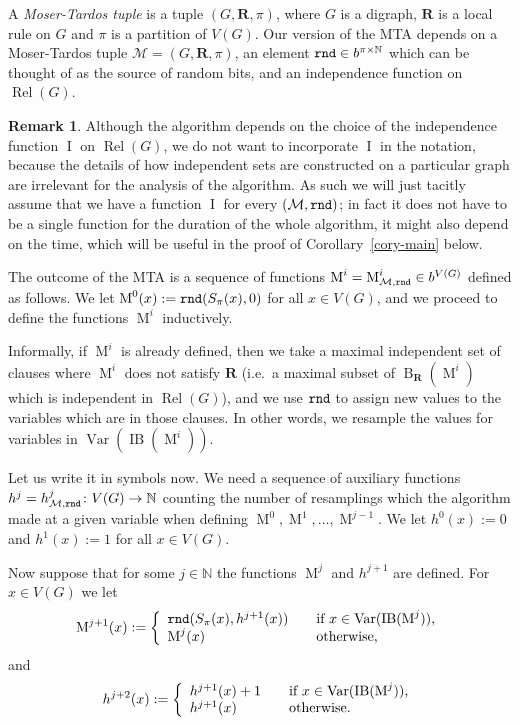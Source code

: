 \documentclass[12pt,a4paper]{article}
\numberwithin{equation}{section}
\theoremstyle{definition}
\newtheorem{remark}[equation]{Remark}
\newenvironment{myrem}{%
        \begin{mdframed}[%
            linewidth=4pt, 
            topline=false, 
            bottomline=false, 
            rightline=false,%
            leftmargin=0pt, 
            innerleftmargin=0.4em, 
            rightmargin=0pt, 
            innerrightmargin=0pt, 
            innertopmargin=0pt ,%
            innerbottommargin=0pt, 
            splittopskip=\topskip, 
            splitbottomskip=0.3\topskip, %
            ]%
        \begin{remark}
    }{%
        \end{remark}
        \end{mdframed}
    }
\newcommand\NN{\mathbb N}
\renewcommand{\cal}[1]{{\mathcal #1}}
\newcommand{\bits}{b}
\newcommand\MT{\operatorname{M}}
\newcommand\I{\operatorname{I}}
\newcommand\B{\operatorname{B}}
\newcommand\IB{\operatorname{IB}}
\newcommand\Rel{\operatorname{Rel}}
\newcommand\Var{\operatorname{Var}}
\begin{document}
    
    A \emph{Moser-Tardos tuple} is a tuple $(G,\mathbf R, \pi)$, where $G$ is a digraph, $\mathbf R$ is a local rule on $G$ and $\pi$ is a partition of $V(G)$. Our version of the MTA depends on a Moser-Tardos tuple $\cal M = (G, \mathbf R, \pi)$, an element $\rnd\in \bits^{\pi\times \NN}$ which can be thought of as the source of random bits, and an independence function on $\Rel(G)$. 
    
    \begin{myrem} Although the algorithm depends on the choice of the independence function $\I$ on $\Rel(G)$, we do not want to incorporate $\I$ in the notation, because the details of how independent sets are constructed on a particular graph are irrelevant for the analysis of the algorithm. As such we will just tacitly assume that we have a function $\I$ for every $(\cal M,\rnd)$; in fact it does not have to be a single function for the duration of the whole algorithm, it might also depend on the time, which will be useful in the proof of Corollary~\ref{cory-main} below.
    \end{myrem}
    
    The outcome of the MTA is a sequence of functions $\MT^i = \MT^i_{\cal M, \rnd}\in b^{V(G)}$ defined as follows.
    We let  $\MT^0(x) := \rnd(S_\pi(x),0)$ for all $x\in V(G)$, and we proceed to define the functions $\MT^i$ inductively. 
    
    Informally, if $\MT^i$ is already defined, then we take a maximal independent set of clauses where $\MT^i$ does not satisfy $\mathbf R$ (i.e.~a maximal subset of $\B_{\mathbf R}(\MT^i)$ which is independent in $\Rel(G)$), and we use $\normalfont{\texttt{rnd}}$ to assign new values to the variables which are in those clauses. In other words, we resample the values for variables in $\Var(\IB(\MT^i))$.
    
    Let us write it in symbols now. We need a sequence of auxiliary functions $h^j= h^j_{\cal M,\rnd}\colon V(G) \to \NN$ counting the number of resamplings which the algorithm made at a given variable when defining $\MT^0,\MT^1,\ldots,\MT^{j-1}$.  We let $h^0(x):=0$ and $h^1(x):=1$ for all $x\in V(G)$. 
    
    Now suppose that for some $j \in \NN$ the functions $\MT^j$ and $h^{j+1}$ are defined. For $x\in V(G)$ we let
    \begin{equation}\label{eq-def-algorithm}
    \MT^{j+1}(x) := 	\left\{\begin{array}{l l}
      		\rnd(S_\pi(x) ,h^{j+1}(x))& \quad \mbox{if $x\in \Var(\IB(\MT^j))$,}\\
    		\MT^{j}(x)& \quad \mbox{otherwise,}\\ 
    	\end{array} \right. 
    \end{equation}
    and 
    $$
    h^{j+2}(x) := 	\left\{\begin{array}{l l}
      		h^{j+1}(x) +1& \quad \mbox{if $x\in \Var(\IB(\MT^{j}))$,}\\
    		h^{j+1}(x) & \quad \mbox{otherwise. }\\ 
    	\end{array} \right.
    $$
    
\end{document}
